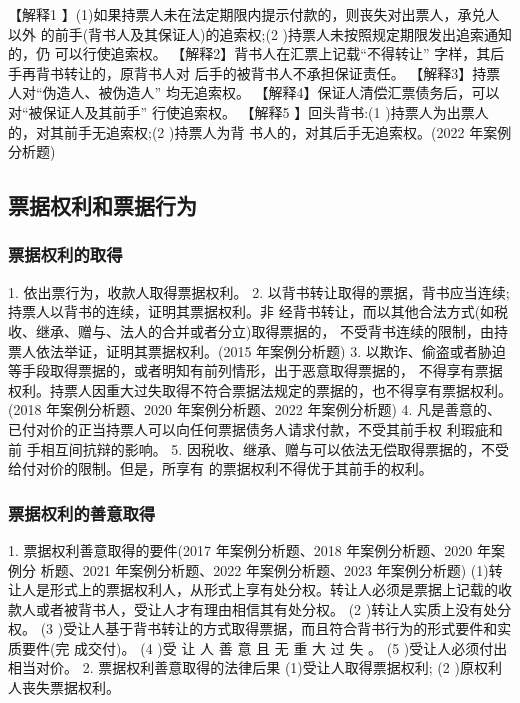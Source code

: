 \documentclass[UTF8,12pt]{ctexart}
\numberwithin{equation}{section} %
\numberwithin{figure}{section}
\numberwithin{table}{section}
\begin{document}
	【解释1 】(1)如果持票人未在法定期限内提示付款的，则丧失对出票人，承兑人以外 的前手(背书人及其保证人)的追索权;(2 )持票人未按照规定期限发出追索通知的，仍 可以行使追索权。
	【解释2】背书人在汇票上记载“不得转让” 字样，其后手再背书转让的，原背书人对 后手的被背书人不承担保证责任。
	【解释3】持票人对“伪造人、被伪造人” 均无追索权。 【解释4】保证人清偿汇票债务后，可以对“被保证人及其前手” 行使追索权。 【解释5 】回头背书:(1 )持票人为出票人的，对其前手无追索权;(2 )持票人为背 书人的，对其后手无追索权。(2022 年案例分析题)
	
	\subsection{票据权利和票据行为}
	
	\subsubsection{票据权利的取得}
	1. 依出票行为，收款人取得票据权利。
	2. 以背书转让取得的票据，背书应当连续;持票人以背书的连续，证明其票据权利。非 经背书转让，而以其他合法方式(如税收、继承、赠与、法人的合并或者分立)取得票据的， 不受背书连续的限制，由持票人依法举证，证明其票据权利。(2015 年案例分析题)
	3. 以欺诈、偷盗或者胁迫等手段取得票据的，或者明知有前列情形，出于恶意取得票据的， 不得享有票据权利。持票人因重大过失取得不符合票据法规定的票据的，也不得享有票据权利。 (2018 年案例分析题、2020 年案例分析题、2022 年案例分析题)
	4. 凡是善意的、已付对价的正当持票人可以向任何票据债务人请求付款，不受其前手权 利瑕疵和前 手相互间抗辩的影响。
	5. 因税收、继承、赠与可以依法无偿取得票据的，不受给付对价的限制。但是，所享有 的票据权利不得优于其前手的权利。
	 
	\subsubsection{票据权利的善意取得} 
	1. 票据权利善意取得的要件(2017 年案例分析题、2018 年案例分析题、2020 年案例分 析题、2021 年案例分析题、2022 年案例分析题、2023 年案例分析题) (1)转让人是形式上的票据权利人，从形式上享有处分权。转让人必须是票据上记载的收 款人或者被背书人，受让人才有理由相信其有处分权。
	(2 )转让人实质上没有处分权。
	(3 )受让人基于背书转让的方式取得票据，而且符合背书行为的形式要件和实质要件(完 成交付)。
	(4 )受 让 人 善 意 且 无 重 大 过 失 。
	(5 )受让人必须付出相当对价。
	2. 票据权利善意取得的法律后果
	(1)受让人取得票据权利;
	(2 )原权利人丧失票据权利。
	
\end{document}
